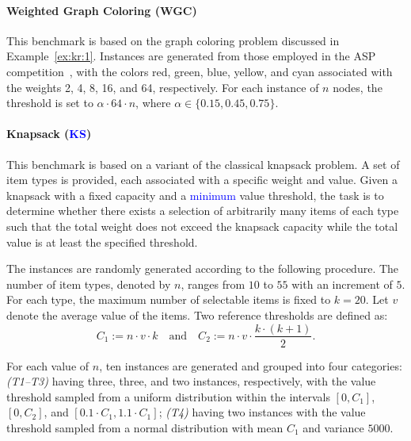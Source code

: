 \documentclass[preprint,authoryear]{elsarticle}
\theoremstyle{definition}
\begin{document}
\paragraph{Weighted Graph Coloring (WGC)}%
This benchmark is based on the graph coloring problem discussed in Example~\ref{ex:kr:1}.
Instances are generated from those employed in the ASP competition~\citep{DBLP:journals/ai/CalimeriGMR16}, with the colors red, green, blue, yellow, and cyan associated with the weights 2, 4, 8, 16, and 64, respectively.
For each instance of $n$ nodes, the threshold is set to $\alpha \cdot 64 \cdot n$, where $\alpha \in \{0.15, 0.45, 0.75\}$.
%


\paragraph{Knapsack (\textcolor{blue}{KS})}%
This benchmark is based on a variant of the classical knapsack problem.  
A set of item types is provided, each associated with a specific weight and value.
Given a knapsack with a fixed capacity and a \textcolor{blue}{minimum} value threshold, the task is to determine whether there exists a selection of arbitrarily many items of each type such that the total weight does not exceed the knapsack capacity while the total value is at least the specified threshold.

The instances are randomly generated according to the following procedure.  
The number of item types, denoted by $n$, ranges from $10$ to $55$ with an increment of $5$.  
For each type, the maximum number of selectable items is fixed to $k = 20$.  
Let $v$ denote the average value of the items.  
Two reference thresholds are defined as:
$$
C_1 := n \cdot v \cdot k \quad \text{and} \quad C_2 := n \cdot v \cdot \frac{k \cdot (k+1)}{2}.
$$

For each value of $n$, ten instances are generated and grouped into four categories:  
\textit{(T1--T3)} having three, three, and two instances, respectively, with the value threshold sampled from a uniform distribution within the intervals $[0, C_1]$, $[0, C_2]$, and $[0.1 \cdot C_1, 1.1 \cdot C_1]$;
\textit{(T4)} having two instances with the value threshold sampled from a normal distribution with mean $C_1$ and variance $5000$.
\end{document}
